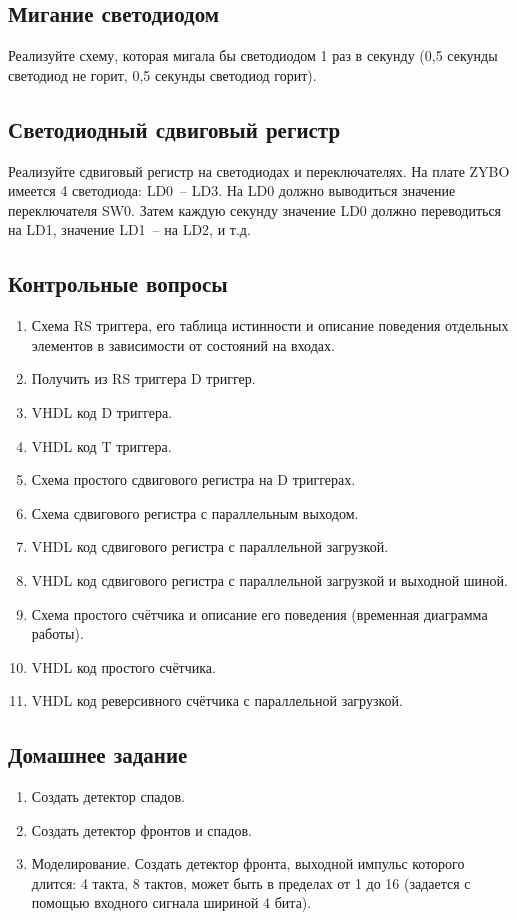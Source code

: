 \subsection{Мигание светодиодом}

Реализуйте схему, которая мигала бы светодиодом 1 раз в секунду (0,5 секунды светодиод не горит, 0,5 секунды светодиод горит).

\subsection{Светодиодный сдвиговый регистр}

Реализуйте сдвиговый регистр на светодиодах и переключателях. На плате ZYBO имеется 4 светодиода: LD0~-- LD3. На LD0 должно выводиться значение переключателя SW0. Затем каждую секунду значение LD0 должно переводиться на LD1, значение LD1~-- на LD2, и т.д.

\subsection{Контрольные вопросы}

\begin{enumerate}
\item Схема RS триггера, его таблица истинности и описание поведения отдельных элементов в зависимости от состояний на входах.
\item Получить из RS триггера D триггер.
\item VHDL код D триггера.
\item VHDL код T триггера.
\item Схема простого сдвигового регистра на D триггерах.
\item Схема сдвигового регистра с параллельным выходом.
\item VHDL код сдвигового регистра с параллельной загрузкой.
\item VHDL код сдвигового регистра с параллельной загрузкой и выходной шиной.
\item Схема простого счётчика и описание его поведения (временная диаграмма работы).
\item VHDL код простого счётчика.
\item VHDL код реверсивного счётчика с параллельной загрузкой.
\end{enumerate}

\subsection{Домашнее задание}

\begin{enumerate}
\item Создать детектор спадов.
\item Создать детектор фронтов и спадов.
\item Моделирование. Создать детектор фронта, выходной импульс которого длится: 4 такта, 8 тактов, может быть в пределах от 1 до 16 (задается с помощью входного сигнала шириной 4 бита).
\end{enumerate}
